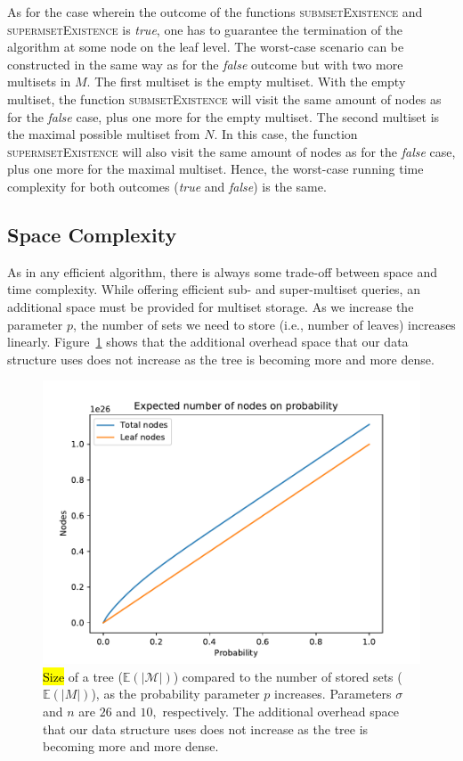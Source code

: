 \documentclass[algorithms,article,accept,pdftex,moreauthors]{Definitions/mdpi}
\begin{document}
As for the case wherein the outcome of the functions \textsc{submsetExistence} and 
\textsc{supermsetExistence} is \emph{true}, one has to guarantee the termination 
of the algorithm at some node on the leaf level. The worst-case scenario can be 
constructed in the same way as for the \emph{false} outcome but with two more 
multisets in $M.$ The first multiset is the empty multiset. With the empty multiset, 
the function \textsc{submsetExistence} will visit the same amount of nodes as for 
the \emph{false} case, plus one more for the empty multiset. The second multiset 
is the maximal possible multiset from $N.$ In this case, the function \textsc{supermsetExistence} 
will also visit the same amount of nodes as for the \emph{false} case, plus one more 
for the maximal multiset. Hence, the worst-case running time complexity for both 
outcomes (\emph{true} and \emph{false}) is the same.

\subsection{Space Complexity}\label{s:spacecomplexity}
As in any efficient algorithm, there is always some trade-off between space and 
time complexity. While offering efficient sub- and super-multiset queries, an 
additional space must be provided for multiset storage. 
As we increase the parameter $p$, the number of sets we need to store (i.e., number of leaves) increases linearly. Figure~\ref{f:exp-nodes} shows that the additional overhead space that our data structure uses does not increase as the tree is becoming more and more dense.


\begin{figure}[H]

\includegraphics[width=.64\textwidth, keepaspectratio]{exp-nodes-on-probab.pdf}
\caption{\hl{Size} %
 of a tree ($\mathbb{E}(|\mathcal{M}|)$) compared to the number of stored sets ($\mathbb{E}(|M|)$), as the probability parameter $p$ increases.
Parameters 
$\sigma$ and $n$ are $26$ and $10,$ respectively.
The additional overhead space that our data structure uses does not increase as the tree is becoming more and more dense.
}
\label{f:exp-nodes}
\end{figure}
\end{document}
